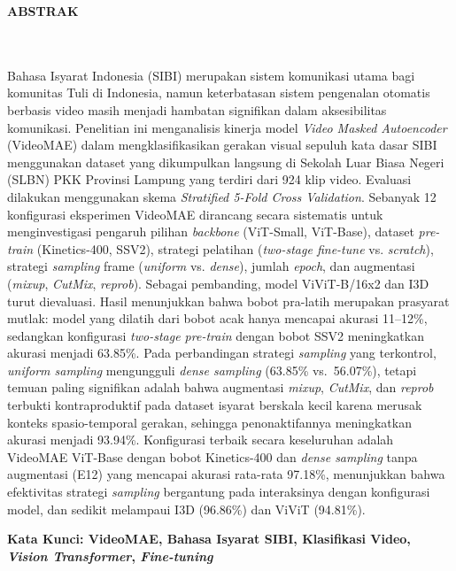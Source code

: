 \clearpage
{}%
\thispagestyle{fancy}

\begin{center}
	\large \bfseries \MakeUppercase{Abstrak}\\
	\normalsize \normalfont {\thetitle}\\
	\normalsize \normalfont {\theauthor}\\
	\bigskip

	\normalsize \normalfont \justifying \singlespacing
	Bahasa Isyarat Indonesia (SIBI) merupakan sistem komunikasi utama bagi komunitas Tuli di Indonesia, namun keterbatasan sistem pengenalan otomatis berbasis video masih menjadi hambatan signifikan dalam aksesibilitas komunikasi. Penelitian ini menganalisis kinerja model \textit{Video Masked Autoencoder} (VideoMAE) dalam mengklasifikasikan gerakan visual sepuluh kata dasar SIBI menggunakan dataset yang dikumpulkan langsung di Sekolah Luar Biasa Negeri (SLBN) PKK Provinsi Lampung yang terdiri dari 924 klip video. Evaluasi dilakukan menggunakan skema \textit{Stratified 5-Fold Cross Validation}. Sebanyak 12 konfigurasi eksperimen VideoMAE dirancang secara sistematis untuk menginvestigasi pengaruh pilihan \textit{backbone} (ViT-Small, ViT-Base), dataset \textit{pre-train} (Kinetics-400, SSV2), strategi pelatihan (\textit{two-stage fine-tune} vs. \textit{scratch}), strategi \textit{sampling} frame (\textit{uniform} vs. \textit{dense}), jumlah \textit{epoch}, dan augmentasi (\textit{mixup}, \textit{CutMix}, \textit{reprob}). Sebagai pembanding, model ViViT-B/16x2 dan I3D turut dievaluasi. Hasil menunjukkan bahwa bobot pra-latih merupakan prasyarat mutlak: model yang dilatih dari bobot acak hanya mencapai akurasi 11--12\%, sedangkan konfigurasi \textit{two-stage pre-train} dengan bobot SSV2 meningkatkan akurasi menjadi 63.85\%. Pada perbandingan strategi \textit{sampling} yang terkontrol, \textit{uniform sampling} mengungguli \textit{dense sampling} (63.85\% vs.\ 56.07\%), tetapi temuan paling signifikan adalah bahwa augmentasi \textit{mixup}, \textit{CutMix}, dan \textit{reprob} terbukti kontraproduktif pada dataset isyarat berskala kecil karena merusak konteks spasio-temporal gerakan, sehingga penonaktifannya meningkatkan akurasi menjadi 93.94\%. Konfigurasi terbaik secara keseluruhan adalah VideoMAE ViT-Base dengan bobot Kinetics-400 dan \textit{dense sampling} tanpa augmentasi (E12) yang mencapai akurasi rata-rata 97.18\%, menunjukkan bahwa efektivitas strategi \textit{sampling} bergantung pada interaksinya dengan konfigurasi model, dan sedikit melampaui I3D (96.86\%) dan ViViT (94.81\%).\par

    \vspace{20pt}
	\raggedright \textbf{Kata Kunci: VideoMAE, Bahasa Isyarat SIBI, Klasifikasi Video, \textit{Vision Transformer}, \textit{Fine-tuning}}

	\vfill

\end{center}
\clearpage

